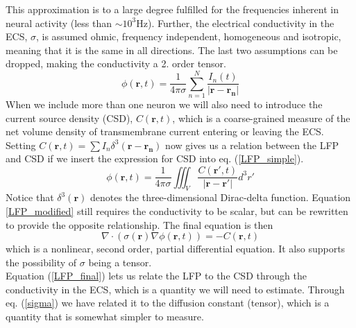 \documentclass[a4paper,english, 12pt, twoside]{article}
\begin{document}
This approximation is to a large degree fulfilled for the frequencies inherent in neural activity (less than $\sim 10^3$Hz). 
Further, the electrical conductivity in the ECS, $\sigma$, is assumed ohmic, frequency independent, homogeneous and isotropic, meaning that it is the same in all directions. 
The last two assumptions can be dropped, making the conductivity a 2. order tensor.
\begin{equation}\label{LFP_simple}
 \phi(\mathbf{r},t) = \frac{1}{4\pi\sigma}\sum\limits_{n=1}^N\frac{I_n(t)}{|\mathbf{r}-\mathbf{r_n}|}
\end{equation}
When we include more than one neuron we will also need to introduce the current source density (CSD), $C(\mathbf{r},t)$, which is a coarse-grained measure of the net volume density of transmembrane current entering or leaving the ECS. 
Setting $C(\mathbf{r},t) = \sum I_n\delta^3(\mathbf{r}-\mathbf{r_n})$ now gives us a relation between the LFP and CSD if we insert the expression for CSD into eq. (\ref{LFP_simple}).
\begin{equation}\label{LFP_modified}
  \phi(\mathbf{r},t) = \frac{1}{4\pi\sigma}\iiint_{V}\frac{C(\mathbf{r'},t)}{|\mathbf{r}-\mathbf{r'}|}d^3r'
\end{equation}
Notice that $\delta^3(\mathbf{r})$ denotes the three-dimensional Dirac-delta function. 
Equation \ref{LFP_modified} still requires the conductivity to be scalar, but can be rewritten to provide the opposite relationship. 
The final equation is then 
\begin{equation}\label{LFP_final}
 \nabla\cdot(\sigma(\mathbf{r})\nabla\phi(\mathbf{r},t)) = -C(\mathbf{r},t)
\end{equation}
which is a nonlinear, second order, partial differential equation. It also supports the possibility of $\sigma$ being a tensor.\\
Equation (\ref{LFP_final}) lets us relate the LFP to the CSD through the conductivity in the ECS, which is a quantity we will need to estimate. 
Through eq. (\ref{sigma}) we have related it to the diffusion constant (tensor), which is a quantity that is somewhat simpler to measure.
\end{document}
